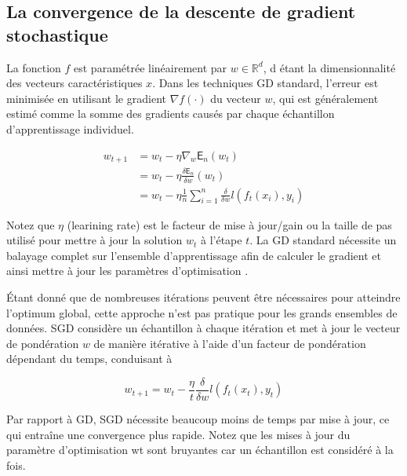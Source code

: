 		
	\subsection{La convergence de la descente de gradient stochastique} \label{sec:convergence_sgd}
	
	La fonction $f$ est paramétrée linéairement par $w \in \mathbb{R}^d$, d étant la dimensionnalité des vecteurs caractéristiques $x$. Dans les techniques GD standard, l’erreur est minimisée en utilisant le gradient $\nabla f(\cdot)$ du vecteur $w$, qui est généralement estimé comme la somme des gradients causés par chaque échantillon d'apprentissage individuel.
	
	\begin{equation*}
		\begin{split}
		w_{t+1}  & = w_t - \eta {\nabla_w \mathsf{E}_n (w_t)} \\
		& = w_t - \eta {\frac {\delta \mathsf{E}_n }{\delta w}(w_t)} \\
		& = w_t - \eta \frac{1}{n} \sum_{i=1}^{n}  {\frac {\delta }{\delta w} l(f_t(x_i),y_i)}
		\end{split}
	\end{equation*}
	
	
	
	Notez que $\eta$ (learining rate) est le facteur de mise à jour/gain ou la taille de pas utilisé pour mettre à jour la solution $w_t$ à l'étape $t$. La GD standard nécessite un balayage complet sur l'ensemble d'apprentissage afin de calculer le gradient et ainsi mettre à jour les paramètres d'optimisation \cite{wijnhoven2010fast}.
	
	Étant donné que de nombreuses itérations peuvent être nécessaires pour atteindre l'optimum global, cette approche n'est pas pratique pour les grands ensembles de données. SGD considère un échantillon à chaque itération et met à jour le vecteur de pondération $w$ de manière itérative à l'aide d'un facteur de pondération dépendant du temps, conduisant à 
	
	\begin{equation*}
		{\displaystyle w_{t+1} = w_t -  \frac{\eta}{t}  {\frac {\delta }{\delta w} l(f_t(x_t),y_t)}}
	\end{equation*}
	
	Par rapport à GD, SGD nécessite beaucoup moins de temps par mise à jour, ce qui entraîne une convergence plus rapide. Notez que les mises à jour du paramètre d'optimisation wt sont bruyantes car un échantillon est considéré à la fois.
	
